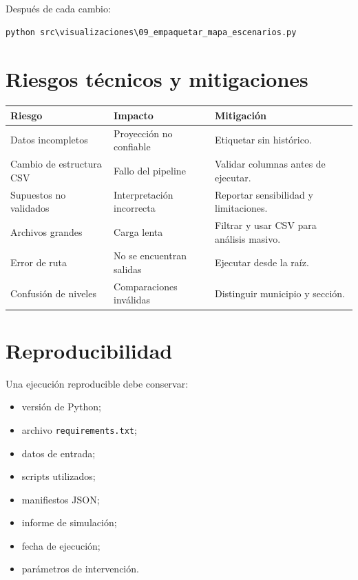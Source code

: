 \documentclass[11pt,a4paper]{article}
\newcommand{\ruta}[1]{\texttt{\small #1}}
\begin{document}
Después de cada cambio:

\begin{lstlisting}[style=terminal]
python src\visualizaciones\09_empaquetar_mapa_escenarios.py
\end{lstlisting}

\section{Riesgos técnicos y mitigaciones}

\begin{longtable}{p{}p{}p{}}
\toprule
\textbf{Riesgo} & \textbf{Impacto} & \textbf{Mitigación}\\
\midrule
Datos incompletos & Proyección no confiable & Etiquetar sin histórico.\\
Cambio de estructura CSV & Fallo del pipeline & Validar columnas antes de ejecutar.\\
Supuestos no validados & Interpretación incorrecta & Reportar sensibilidad y limitaciones.\\
Archivos grandes & Carga lenta & Filtrar y usar CSV para análisis masivo.\\
Error de ruta & No se encuentran salidas & Ejecutar desde la raíz.\\
Confusión de niveles & Comparaciones inválidas & Distinguir municipio y sección.\\
\bottomrule
\end{longtable}

\section{Reproducibilidad}

Una ejecución reproducible debe conservar:

\begin{itemize}
    \item versión de Python;
    \item archivo \ruta{requirements.txt};
    \item datos de entrada;
    \item scripts utilizados;
    \item manifiestos JSON;
    \item informe de simulación;
    \item fecha de ejecución;
    \item parámetros de intervención.
\end{itemize}
\end{document}
